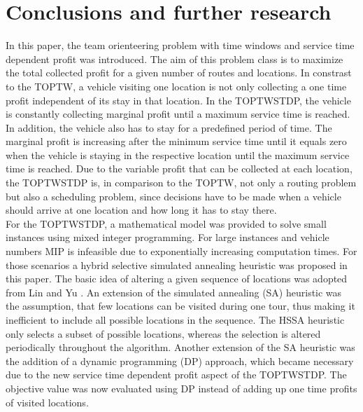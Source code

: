 \documentclass[final,5p,times,twocolumn]{elsarticle}
\begin{document}
{{{{{{{{{{{{{%

\section{Conclusions and further research}
In this paper, the team orienteering problem with time windows and service time dependent profit was introduced. The aim of this problem class is to maximize the total collected profit for a given number of routes and locations. In constrast to the TOPTW, a vehicle visiting one location is not only collecting a one time profit independent of its stay in that location. In the TOPTWSTDP, the vehicle is constantly collecting marginal profit until a maximum service time is reached. In addition, the vehicle also has to stay for a predefined period of time. The marginal profit is increasing after the minimum service time until it equals zero when the vehicle is staying in the respective location until the maximum service time is reached. Due to the variable profit that can be collected at each location, the TOPTWSTDP is, in comparison to the TOPTW, not only a routing problem but also a scheduling problem, since decisions have to be made when a vehicle should arrive at one location and how long it has to stay there. \\
For the TOPTWSTDP, a mathematical model was provided to solve small instances using mixed integer programming. For large instances and vehicle numbers MIP is infeasible due to exponentially increasing computation times. For those scenarios a hybrid selective simulated annealing heuristic was proposed in this paper. The basic idea of altering a given sequence of locations was adopted from Lin and Yu \citep{Lin:2012sa}. An extension of the simulated annealing (SA) heuristic was the assumption, that few locations can be visited during one tour, thus making it inefficient to include all possible locations in the sequence. The HSSA heuristic only selects a subset of possible locations, whereas the selection is altered periodically throughout the algorithm. Another extension of the SA heuristic was the addition of a dynamic programming (DP) approach, which became necessary due to the new service time dependent profit aspect of the TOPTWSTDP. The objective value was now evaluated using DP instead of adding up one time profits of visited locations. \\
}}}}}}}}}}}}}
\end{document}
